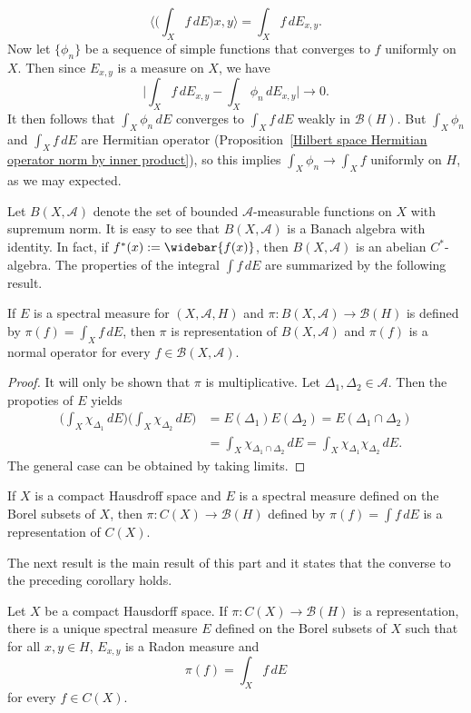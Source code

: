 \[\langle\Big(\int_Xf\,dE\Big)x,y\rangle=\int_Xf\,dE_{x,y}.\]
Now let $\{\phi_n\}$ be a sequence of simple functions that converges to $f$ uniformly on $X$. Then since $E_{x,y}$ is a measure on $X$, we have
\[\Big|\int_Xf\,dE_{x,y}-\int_X\phi_n\,dE_{x,y}\Big|\to 0.\]
It then follows that $\int_X\phi_n\,dE$ converges to $\int_Xf\,dE$ weakly in $\mathcal{B}(H)$. But $\int_X\phi_n$ and $\int_Xf\,dE$ are Hermitian operator (Proposition~\ref{Hilbert space Hermitian operator norm by inner product}), so this implies $\int_X\phi_n\to\int_Xf$ uniformly on $H$, as we may expected.\par
Let $B(X,\mathcal{A})$ denote the set of bounded $\mathcal{A}$-measurable functions on $X$ with supremum norm. It is easy to see that $B(X,\mathcal{A})$ is a Banach algebra with identity. In fact, if $f^*(x):=\widebar{f(x)}$, then $B(X,\mathcal{A})$ is an abelian $C^*$-algebra. The properties of the integral $\int f\,dE$ are summarized by the following result.
\begin{proposition}\label{Hilbert space spectral integration prop}
If $E$ is a spectral measure for $(X,\mathcal{A},H)$ and $\pi:B(X,\mathcal{A})\to\mathcal{B}(H)$ is defined by $\pi(f)=\int_Xf\,dE$, then $\pi$ is representation of $B(X,\mathcal{A})$ and $\pi(f)$ is a normal operator for every $f\in\mathcal{B}(X,\mathcal{A})$.
\end{proposition}
\begin{proof}
It will only be shown that $\pi$ is multiplicative. Let $\Delta_1,\Delta_2\in\mathcal{A}$. Then the propoties of $E$ yields
\begin{align*}
\Big(\int_X\chi_{\Delta_1}\,dE\big)\Big(\int_X\chi_{\Delta_2}\,dE\Big)&=E(\Delta_1)E(\Delta_2)=E(\Delta_1\cap\Delta_2)\\
&=\int_X\chi_{\Delta_1\cap\Delta_2}\,dE=\int_X\chi_{\Delta_1}\chi_{\Delta_2}\,dE.
\end{align*}
The general case can be obtained by taking limits.
\end{proof}
\begin{corollary}
If $X$ is a compact Hausdroff space and $E$ is a spectral measure defined on the Borel subsets of $X$, then $\pi:C(X)\to\mathcal{B}(H)$ defined by $\pi(f)=\int f\,dE$ is a representation of $C(X)$.
\end{corollary}
The next result is the main result of this part and it states that the converse to the preceding corollary holds.
\begin{theorem}\label{Riesz representation on Hilbert space for C(X)}
Let $X$ be a compact Hausdorff space. If $\pi:C(X)\to\mathcal{B}(H)$ is a representation, there is a unique spectral measure $E$ defined on the Borel subsets of $X$ such that for all $x,y\in H$, $E_{x,y}$ is a Radon measure and
\[\pi(f)=\int_Xf\,dE\]
for every $f\in C(X)$.
\end{theorem}
